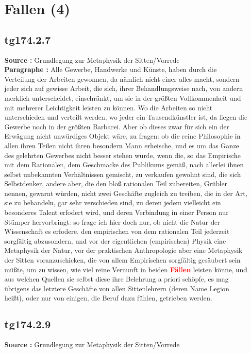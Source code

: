 \documentclass[a4paper,12pt,twoside]{book}
\newcommand{\match}[1]{\textcolor{red}{\textbf{#1}}}
\newcommand{\unnumberedsection}[1]{
	\section*{#1}
	\addcontentsline{toc}{section}{#1}
	\markright{#1}
}
\begin{document}
	\unnumberedsection{Fallen (4)} 
	\subsection*{tg174.2.7} 
	\textbf{Source : }Grundlegung zur Metaphysik der Sitten/Vorrede\\  
	
	\noindent\textbf{Paragraphe : }Alle Gewerbe, Handwerke und Künste, haben durch die Verteilung der Arbeiten gewonnen, da nämlich nicht einer alles macht, sondern jeder sich auf gewisse Arbeit, die sich, ihrer Behandlungsweise nach, von andern merklich unterscheidet, einschränkt, um sie in der größten Vollkommenheit und mit mehrerer Leichtigkeit leisten zu können. Wo die Arbeiten so nicht unterschieden und verteilt werden, wo jeder ein Tausendkünstler ist, da liegen die Gewerbe noch in der größten Barbarei. Aber ob dieses zwar für sich ein der Erwägung nicht unwürdiges Objekt wäre, zu fragen: ob die reine Philosophie in allen ihren Teilen nicht ihren besondern Mann erheische, und es um das Ganze des gelehrten Gewerbes nicht besser stehen würde, wenn die, so das Empirische mit dem Rationalen, dem Geschmacke des Publikums gemäß, nach allerlei ihnen selbst unbekannten Verhältnissen gemischt, zu verkaufen gewohnt sind, die sich Selbstdenker, andere aber, die den bloß rationalen Teil zubereiten, Grübler nennen, gewarnt würden, nicht zwei Geschäfte zugleich zu treiben, die in der Art, sie zu behandeln, gar sehr verschieden sind, zu deren jedem vielleicht ein besonderes Talent erfodert wird, und deren Verbindung in einer Person nur Stümper hervorbringt: so frage ich hier doch nur, ob nicht die Natur der Wissenschaft es erfodere, den empirischen von dem rationalen Teil jederzeit sorgfältig abzusondern, und vor der eigentlichen (empirischen) Physik eine Metaphysik der Natur, vor der praktischen Anthropologie aber eine Metaphysik der Sitten voranzuschicken, die von allem Empirischen sorgfältig gesäubert sein müßte, um zu  wissen, wie viel reine Vernunft in beiden \match{Fällen} leisten könne, und aus welchen Quellen sie selbst diese ihre Belehrung a priori schöpfe, es mag übrigens das letztere Geschäfte von allen Sittenlehrern (deren Name Legion heißt), oder nur von einigen, die Beruf dazu fühlen, getrieben werden. 
	
	\subsection*{tg174.2.9} 
	\textbf{Source : }Grundlegung zur Metaphysik der Sitten/Vorrede\\  
	
\end{document}
